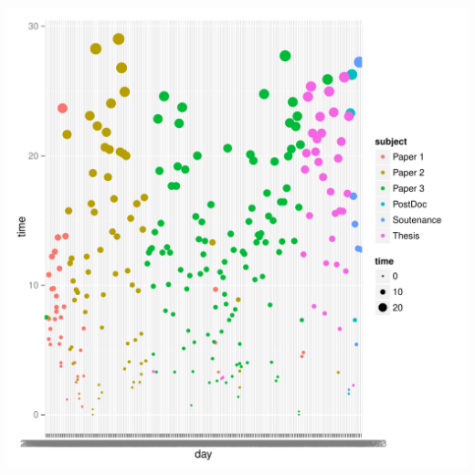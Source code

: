 \documentclass{report}\usepackage[]{graphicx}\usepackage[]{color}
\makeatletter
\def\maxwidth{ %
  \ifdim\Gin@nat@width>\linewidth
    \linewidth
  \else
    \Gin@nat@width
  \fi
}
\newenvironment{knitrout}{}{} %
\makeatother
\begin{document}
\begin{knitrout}
\includegraphics[width=\maxwidth]{figure/unnamed-chunk-7} 

\end{knitrout}
\end{document}
